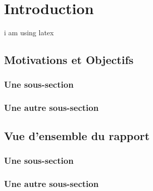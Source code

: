 \chapter{Introduction}
i am using \gls{latex}
\lipsum %

\section{Motivations et Objectifs}

\lipsum %

\subsection{Une sous-section}

\lipsum %

\subsection{Une autre sous-section}

\lipsum %


\section{Vue d'ensemble du rapport}

\lipsum %

\subsection{Une sous-section}

\lipsum %

\subsection{Une autre sous-section}

\lipsum %